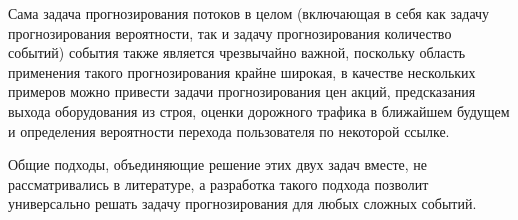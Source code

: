 Сама задача прогнозирования потоков в целом (включающая в себя как задачу прогнозирования вероятности, так и задачу прогнозирования количество событий) события также является чрезвычайно важной, поскольку область применения такого прогнозирования крайне широкая, в качестве нескольких примеров можно привести задачи прогнозирования цен акций, предсказания выхода оборудования из строя, оценки дорожного трафика в ближайшем будущем и определения вероятности перехода пользователя по некоторой ссылке.

Общие подходы, объединяющие решение этих двух задач вместе, не рассматривались в литературе, а разработка такого подхода позволит универсально решать задачу прогнозирования для любых сложных событий.